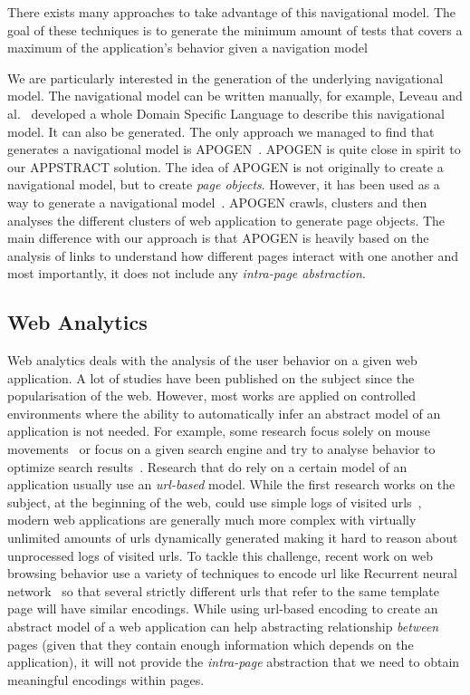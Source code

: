 There exists many approaches to take advantage of this navigational model. The goal of these techniques is to generate the minimum amount of tests that covers a maximum of the application's behavior given a navigation model~\cite{leveau2022fostering, mesbah2009invariant, yuan2007using, biagiola2019diversity}

We are particularly interested in the generation of the underlying navigational model.
The navigational model can be written manually, for example, Leveau and al.~\cite{leveau2022fostering} developed a whole Domain Specific Language to describe this navigational model. 
It can also be generated. The only approach we managed to find that generates a navigational model is APOGEN~\cite{stocco2017apogen}. APOGEN is quite close in spirit to our APPSTRACT solution. The idea of APOGEN is not originally to create a navigational model, but to create \textit{page objects}. However, it has been used as a way to generate a navigational model~\cite{biagiola2019diversity}. APOGEN crawls, clusters and then analyses the different clusters of web application to generate page objects. The main difference with our approach is that APOGEN is heavily based on the analysis of links to understand how different pages interact with one another and most importantly, it does not include any \textit{intra-page abstraction}.

\subsection{Web Analytics}
Web analytics deals with the analysis of the user behavior on a given web application.
A lot of studies have been published on the subject since the popularisation of the web. However, most works are applied on controlled environments where the ability to automatically infer an abstract model of an application is not needed. For example, some research focus solely on mouse movements~\cite{guo2008exploring, yamauchi2013mouse} or focus on a given search engine and try to analyse behavior to optimize search results~\cite{agichtein2006learning, agichtein2006improving}.
Research that do rely on a certain model of an application usually use an \textit{url-based} model. While the first research works on the subject, at the beginning of the web, could use simple logs of visited urls~\cite{gunduz2003web, mobasher2001effective, sarukkai2000link}, modern web applications are generally much more complex with virtually unlimited amounts of urls dynamically generated making it hard to reason about unprocessed logs of visited urls.
To tackle this challenge, recent work on web browsing behavior use a variety of techniques to encode url like Recurrent neural network~\cite{Ou2021ModelingSide} so that several strictly different urls that refer to the same template page will have similar encodings. While using url-based encoding to create an abstract model of a web application can help abstracting relationship \textit{between} pages (given that they contain enough information which depends on the application), it will not provide the \textit{intra-page} abstraction that we need to obtain meaningful encodings within pages.

